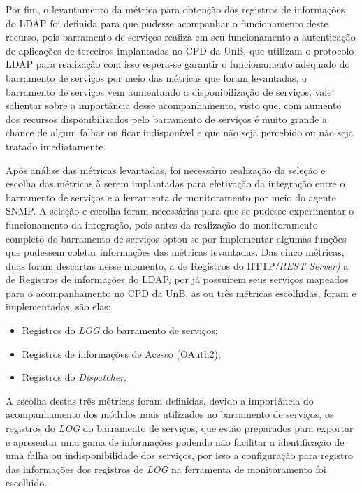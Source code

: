 Por fim, o levantamento da métrica para obtenção dos registros de informações do LDAP foi definida para que pudesse acompanhar o funcionamento deste recurso, pois barramento de serviços realiza em seu funcionamento a autenticação de aplicações de terceiros implantadas no CPD da UnB, que utilizam o protocolo LDAP para realização com isso espera-se garantir o funcionamento adequado do barramento de serviços por meio das métricas que foram levantadas, o barramento de serviços vem aumentando a disponibilização de serviços, vale salientar sobre a importância desse acompanhamento, visto que, com aumento dos recursos disponibilizados pelo barramento de serviços é muito grande a chance de algum falhar ou ficar indisponível e que não seja percebido ou não seja tratado imediatamente.  

Após análise das métricas levantadas, foi necessário realização da seleção e escolha das métricas à serem implantadas para efetivação da integração entre o barramento de serviços e a ferramenta de monitoramento por meio do agente \acrshort{SNMP}. A seleção e escolha foram necessárias para que se pudesse experimentar o funcionamento da integração, pois antes da realização do monitoramento completo do barramento de serviços optou-se por implementar algumas funções que pudessem coletar informações das métricas levantadas. Das cinco métricas, duas foram descartas nesse momento, a de Registros do HTTP\textit{(REST Server)} a de Registros de informações do LDAP, por já possuírem seus serviços mapeados para o acompanhamento no \acrshort{CPD} da \acrshort{UnB}, as ou três métricas escolhidas, foram e implementadas, são elas: 

\begin{itemize}
    \item Registros do \textit{LOG} do barramento de serviços;
    \item Registros de informações de Acesso (OAuth2);
    \item Registros do \textit{Dispatcher}.
\end{itemize}

A escolha destas três métricas foram definidas, devido a importância do acompanhamento dos módulos mais utilizados no barramento de serviços, os registros do \textit{LOG} do barramento de serviços, que estão preparados para exportar e apresentar uma gama de informações podendo não facilitar a identificação de uma falha ou indisponibilidade dos serviços, por isso a configuração para registro das informações dos registros de \textit{LOG} na ferramenta de monitoramento foi escolhido. 

